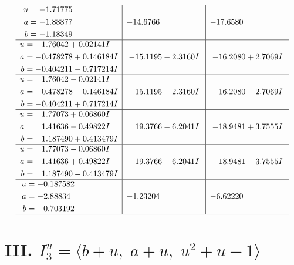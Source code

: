 \documentclass[1p]{elsarticle_modified}
\theoremstyle{definition}
\begin{document}
$$\begin{array}{c|c|c}
\begin{aligned}
u &= -1.71775\phantom{ +0.000000I} \\
a &= -1.88877\phantom{ +0.000000I} \\
b &= -1.18349\phantom{ +0.000000I}\end{aligned}
 & -14.6766\phantom{ +0.000000I} & -17.6580\phantom{ +0.000000I} \\ \hline\begin{aligned}
u &= \phantom{-}1.76042 + 0.02141 I \\
a &= -0.478278 + 0.146184 I \\
b &= -0.404211 - 0.717214 I\end{aligned}
 & -15.1195 - 2.3160 I & -16.2080 + 2.7069 I \\ \hline\begin{aligned}
u &= \phantom{-}1.76042 - 0.02141 I \\
a &= -0.478278 - 0.146184 I \\
b &= -0.404211 + 0.717214 I\end{aligned}
 & -15.1195 + 2.3160 I & -16.2080 - 2.7069 I \\ \hline\begin{aligned}
u &= \phantom{-}1.77073 + 0.06860 I \\
a &= \phantom{-}1.41636 - 0.49822 I \\
b &= \phantom{-}1.187490 + 0.413479 I\end{aligned}
 & \phantom{-}19.3766 - 6.2041 I & -18.9481 + 3.7555 I \\ \hline\begin{aligned}
u &= \phantom{-}1.77073 - 0.06860 I \\
a &= \phantom{-}1.41636 + 0.49822 I \\
b &= \phantom{-}1.187490 - 0.413479 I\end{aligned}
 & \phantom{-}19.3766 + 6.2041 I & -18.9481 - 3.7555 I \\ \hline\begin{aligned}
u &= -0.187582\phantom{ +0.000000I} \\
a &= -2.88834\phantom{ +0.000000I} \\
b &= -0.703192\phantom{ +0.000000I}\end{aligned}
 & -1.23204\phantom{ +0.000000I} & -6.62220\phantom{ +0.000000I}\\
 \hline 
 \end{array}$$\newpage\newpage\renewcommand{\arraystretch}{1}
\centering \section*{III. $I^u_{3}= \langle b+u,\;a+u,\;u^2+u-1 \rangle$}
\end{document}
